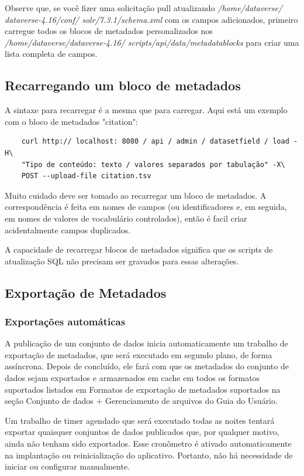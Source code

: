 \documentclass[12pt,hidelinks]{article}
\begin{document}
Observe que, se você fizer uma solicitação pull atualizando \textit{/home/dataverse/ dataverse-4.16/conf/ solr/7.3.1/schema.xml} com os campos adicionados, primeiro carregue todos os blocos de metadados personalizados nos \textit{/home/dataverse/dataverse-4.16/ scripts/api/data/metadatablocks} para criar uma lista completa de campos.

\subsection{Recarregando um bloco de metadados}

\qquad A sintaxe para recarregar é a mesma que para carregar. Aqui está um exemplo com o bloco de metadados "citation":\\
\begin{verbatim}
    curl http:// localhost: 8080 / api / admin / datasetfield / load -H\ 
    "Tipo de conteúdo: texto / valores separados por tabulação" -X\ 
    POST --upload-file citation.tsv
\end{verbatim}
Muito cuidado deve ser tomado ao recarregar um bloco de metadados. A correspondência é feita em nomes de campos (ou identificadores e, em seguida, em nomes de valores de vocabulário controlados), então é  facil criar acidentalmente campos duplicados.

A capacidade de recarregar blocos de metadados significa que os scripts de atualização SQL não precisam ser gravados para essas alterações.
        
\subsection{Exportação de Metadados}

\subsubsection{Exportações automáticas}

\qquad A publicação de um conjunto de dados inicia automaticamente um trabalho de exportação de metadados, que será executado em segundo plano, de forma assíncrona. Depois de concluído, ele fará com que os metadados do conjunto de dados sejam exportados e armazenados em cache em todos os formatos suportados listados em Formatos de exportação de metadados suportados na seção Conjunto de dados + Gerenciamento de arquivos do Guia do Usuário.

Um trabalho de timer agendado que será executado todas as noites tentará exportar quaisquer conjuntos de dados publicados que, por qualquer motivo, ainda não tenham sido exportados. Esse cronômetro é ativado automaticamente na implantação ou reinicialização do aplicativo. Portanto, não há necessidade de iniciar ou configurar manualmente.
\end{document}
